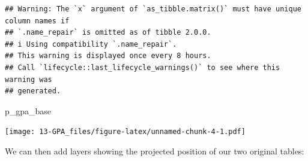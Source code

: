 \documentclass[
]{book}
\newenvironment{Shaded}{\begin{snugshade}}{\end{snugshade}}
\newcommand{\NormalTok}[1]{#1}
\begin{document}
\begin{verbatim}
## Warning: The `x` argument of `as_tibble.matrix()` must have unique column names if
## `.name_repair` is omitted as of tibble 2.0.0.
## i Using compatibility `.name_repair`.
## This warning is displayed once every 8 hours.
## Call `lifecycle::last_lifecycle_warnings()` to see where this warning was
## generated.
\end{verbatim}

\begin{Shaded}
\begin{Highlighting}[]
\NormalTok{p\_gpa\_base}
\end{Highlighting}
\end{Shaded}

\texttt{[image: 13-GPA\_files/figure-latex/unnamed-chunk-4-1.pdf]}

We can then add layers showing the projected position of our two original tables:
\end{document}
